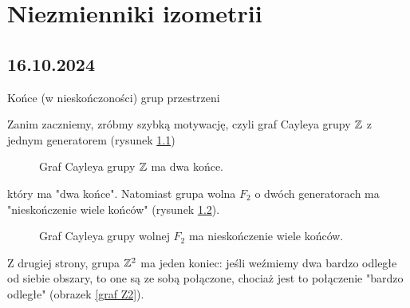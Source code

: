 \chapter{Niezmienniki izometrii}

\section{16.10.2024}{Końce (w nieskończoności) grup przestrzeni}

Zanim zaczniemy, zróbmy szybką motywację, czyli graf Cayleya grupy $\mathbb{Z}$ z jednym generatorem (rysunek \ref{Z graf})
\begin{figure}[H]\center

  \caption{\label{Z graf}Graf Cayleya grupy $\mathbb{Z}$ ma dwa końce.}
\end{figure}
który ma "dwa końce". Natomiast grupa wolna $F_2$ o dwóch generatorach ma "nieskończenie wiele końców" (rysunek \ref{graf F2}).
\begin{figure}[H]\center
  \caption{\label{graf F2}Graf Cayleya grupy wolnej $F_2$ ma nieskończenie wiele końców.}
\end{figure}
Z drugiej strony, grupa $\mathbb{Z}^2$ ma jeden koniec: jeśli weźmiemy dwa bardzo odległe od siebie obszary, to one są ze sobą połączone, chociaż jest to połączenie "bardzo odległe" (obrazek \ref{graf Z2}).

